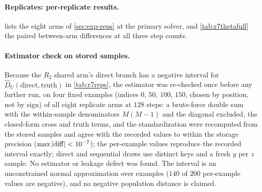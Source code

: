 \documentclass{article}
\theoremstyle{plain}
\theoremstyle{definition}
\theoremstyle{remark}
\begin{document}
\paragraph{Replicates: per-replicate results.}
 lists the eight arms of \cref{sec:exp-reps} at the primary solver, and \cref{tab:r7thetafull} the paired between-arm differences at all three step counts.
\begin{table}[h]
\centering
\caption{Paired between-arm difference at the target level at all three step counts ($\times10^{3}$): per-replicate means with pointwise 95\% CIs, $\widehat\Theta_h$ with its normal CI over examples, and the example bootstrap (2000 resamples; replicates, arms and step counts of an example carried together).}
\label{tab:r7thetafull}
\scriptsize
\setlength{\tabcolsep}{3pt}

\end{table}
\begin{table}[h]
\centering
\caption{Four training replicates on the new test set (Test~P at $128$ steps, $N=200$, $M=64$, $B=199$). $\widehat\Delta_T$ is the unbiased gap estimate; $\widehat D_U$ is the unbiased sample energy distance of a branch to the true $q(z\mid x)$ (may be negative; the negative interval of the $R_2$ shared arm is an unconstrained approximate interval, \cref{app:edcheck}); sd ratios are the sample sd of a branch over the true conditional sd. Standardized scale; intervals are normal 95\% CIs over examples.}
\label{tab:r7reps}
\scriptsize
\setlength{\tabcolsep}{3pt}

\end{table}

\paragraph{Estimator check on stored samples.}
\label{app:edcheck}
Because the $R_2$ shared arm's direct branch has a negative interval for $\widehat D_U(\text{direct},\text{truth})$ in \cref{tab:r7reps}, the estimator was re-checked once before any further run, on four fixed examples (indices $0$, $50$, $100$, $150$, chosen by position, not by sign) of all eight replicate arms at $128$ steps: a brute-force double sum with the within-sample denominators $M(M-1)$ and the diagonal excluded, the closed-form cross and truth terms, and the standardization were recomputed from the stored samples and agree with the recorded values to within the storage precision ($\max|{\rm diff}|<10^{-7}$); the per-example values reproduce the recorded interval exactly; direct and sequential draws use distinct keys and a fresh $y$ per $z$ sample.
No estimator or leakage defect was found. The interval is an unconstrained normal approximation over examples ($140$ of $200$ per-example values are negative), and no negative population distance is claimed.
\end{document}
